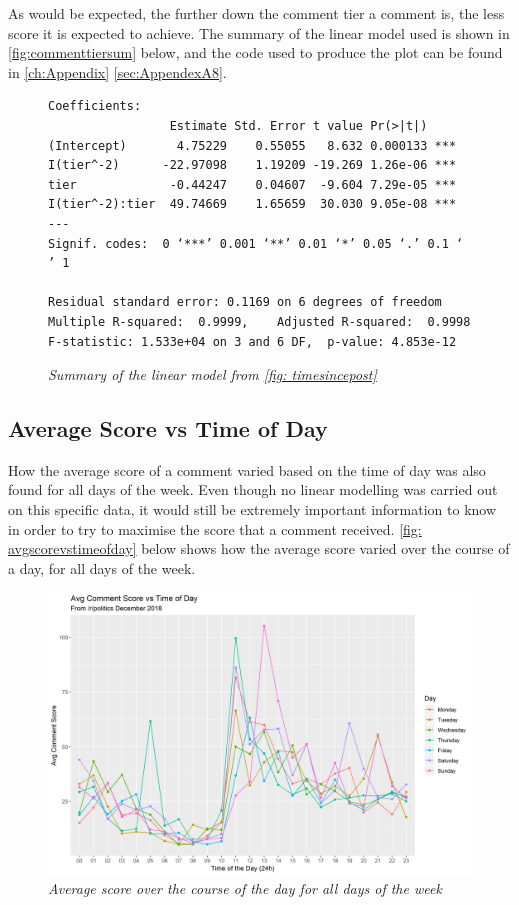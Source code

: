 As would be expected, the further down the comment tier a comment is, the less score it is expected to achieve. The summary of the linear model used is shown in \autoref{fig:commenttiersum} below, and the code used to produce the plot can be found in \autoref{ch:Appendix} \autoref{sec:AppendexA8}.

\begin{figure}[H]
    \begin{lstlisting}
Coefficients:
                 Estimate Std. Error t value Pr(>|t|)    
(Intercept)       4.75229    0.55055   8.632 0.000133 ***
I(tier^-2)      -22.97098    1.19209 -19.269 1.26e-06 ***
tier             -0.44247    0.04607  -9.604 7.29e-05 ***
I(tier^-2):tier  49.74669    1.65659  30.030 9.05e-08 ***
---
Signif. codes:  0 ‘***’ 0.001 ‘**’ 0.01 ‘*’ 0.05 ‘.’ 0.1 ‘ ’ 1

Residual standard error: 0.1169 on 6 degrees of freedom
Multiple R-squared:  0.9999,	Adjusted R-squared:  0.9998 
F-statistic: 1.533e+04 on 3 and 6 DF,  p-value: 4.853e-12
    \end{lstlisting}
    \caption{\textit{Summary of the linear model from \autoref{fig: timesincepost}}}
    \label{fig:commenttiersum}
    \end{figure}
    
\subsection{Average Score vs Time of Day}
How the average score of a comment varied based on the time of day was also found for all days of the week. Even though no linear modelling was carried out on this specific data, it would still be extremely important information to know in order to try to maximise the score that a comment received. \autoref{fig: avgscorevstimeofday} below shows how the average score varied over the course of a day, for all days of the week.

 \begin{figure}[H]
        \centering
        \includegraphics[width=1.0\textwidth]{graphs/avgscorevstimeofday.png}
        \caption{\textit{Average score over the course of the day for all days of the week}}
        \label{fig: avgscorevstimeofday}
    \end{figure}
    
